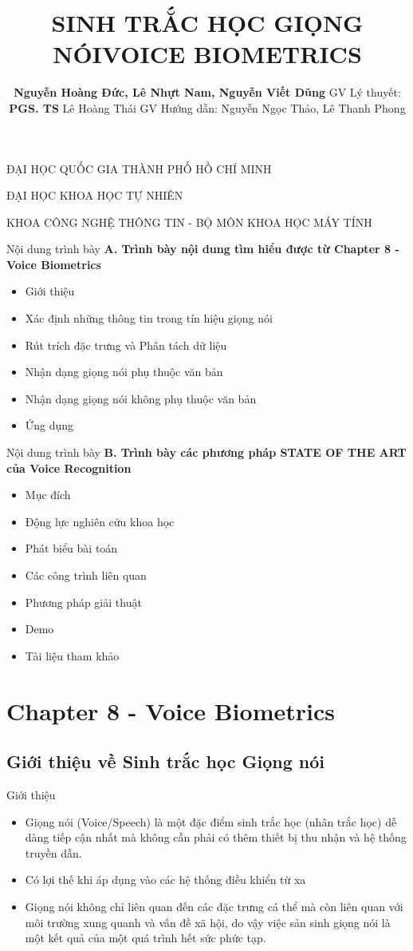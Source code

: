 \documentclass[notheorems, aspectratio=54]{beamer}
\author{\textbf{Nguyễn Hoàng Đức, Lê Nhựt Nam, Nguyễn Viết Dũng}\newline\newline
	GV Lý thuyết: \textbf{PGS. TS} Lê Hoàng Thái\newline
	GV Hướng dẫn: Nguyễn Ngọc Thảo, Lê Thanh Phong}
\title{SINH TRẮC HỌC GIỌNG NÓI\newline VOICE BIOMETRICS}
\begin{document}
\begin{frame}
	\centering
	ĐẠI HỌC QUỐC GIA THÀNH PHỐ HỒ CHÍ MINH
	
	ĐẠI HỌC KHOA HỌC TỰ NHIÊN
	
	KHOA CÔNG NGHỆ THÔNG TIN - BỘ MÔN KHOA HỌC MÁY TÍNH
	\titlepage
\end{frame}
\begin{frame}{Nội dung trình bày}
	\textbf{A. Trình bày nội dung tìm hiểu được từ Chapter 8 - Voice Biometrics}
	\begin{itemize}
		\item Giới thiệu
		\item Xác định những thông tin trong tín hiệu giọng nói
		\item Rút trích đặc trưng và Phân tách dữ liệu
		\item Nhận dạng giọng nói phụ thuộc văn bản
		\item Nhận dạng giọng nói không phụ thuộc văn bản
		\item Ứng dụng
	\end{itemize}
\end{frame}
\begin{frame}{Nội dung trình bày}
	\textbf{B. Trình bày các phương pháp STATE OF THE ART của Voice Recognition}
	\begin{itemize}
		\item Mục đích
		\item Động lực nghiên cứu khoa học 
		\item Phát biểu bài toán
		\item Các công trình liên quan
		\item Phương pháp giải thuật
		\item Demo
		\item Tài liệu tham khảo
	\end{itemize}
\end{frame}

\section{Chapter 8 - Voice Biometrics}
\subsection{Giới thiệu về Sinh trắc học Giọng nói}
\begin{frame}{Giới thiệu}
	\begin{itemize}
		\item Giọng nói (Voice/Speech) là một đặc điểm sinh trắc học (nhân trắc học) dễ dàng tiếp cận nhất mà không cần phải có thêm thiết bị thu nhận và hệ thống truyền dẫn.
		\item Có lợi thế khi áp dụng vào các hệ thống điều khiển từ xa
		\item Giọng nói không chỉ liên quan đến các đặc trưng cá thể mà còn liên quan với môi trường xung quanh và vấn đề xã hội, do vậy việc sản sinh giọng nói là một kết quả của một quá trình hết sức phức tạp.
	\end{itemize}
\end{frame}
\end{document}
